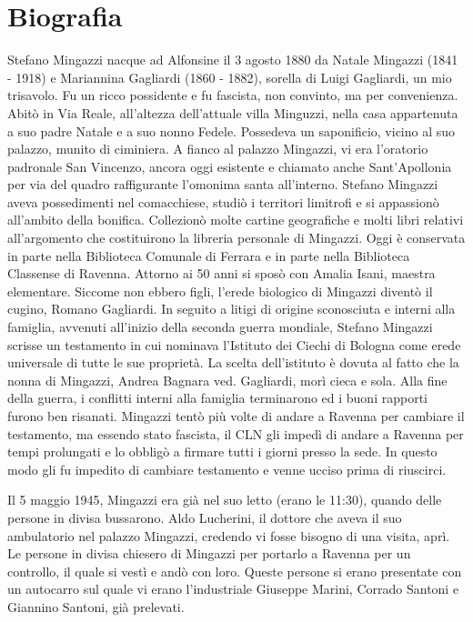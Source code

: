 
\chapter*{Biografia}
Stefano Mingazzi nacque ad Alfonsine il 3 agosto 1880 da Natale Mingazzi (1841 - 1918) e Mariannina Gagliardi (1860 - 1882), sorella di Luigi Gagliardi, un mio trisavolo. Fu un ricco possidente e fu fascista, non convinto, ma per convenienza. Abitò in Via Reale, all'altezza dell'attuale villa Minguzzi, nella casa appartenuta a suo padre Natale e a suo nonno Fedele. Possedeva un saponificio, vicino al suo palazzo, munito di ciminiera. A fianco al palazzo Mingazzi, vi era l'oratorio padronale San Vincenzo, ancora oggi esistente e chiamato anche Sant'Apollonia per via del quadro raffigurante l'omonima santa all'interno.
Stefano Mingazzi aveva possedimenti nel comacchiese, studiò i territori limitrofi e si appassionò all'ambito della bonifica. Collezionò molte cartine geografiche e molti libri relativi all'argomento che costituirono la libreria personale di Mingazzi. Oggi è conservata in parte nella Biblioteca Comunale di Ferrara e in parte nella Biblioteca Classense di Ravenna.
Attorno ai 50 anni si sposò con Amalia Isani, maestra elementare. Siccome non ebbero figli, l'erede biologico di Mingazzi diventò il cugino, Romano Gagliardi. In seguito a litigi di origine sconosciuta e interni alla famiglia, avvenuti all'inizio della seconda guerra mondiale, Stefano Mingazzi scrisse un testamento in cui nominava l'Istituto dei Ciechi di Bologna come erede universale di tutte le sue proprietà. La scelta dell'istituto è dovuta al fatto che la nonna di Mingazzi, Andrea Bagnara ved. Gagliardi, morì cieca e sola. Alla fine della guerra, i conflitti interni alla famiglia terminarono ed i buoni rapporti furono ben risanati. Mingazzi tentò più volte di andare a Ravenna per cambiare il testamento, ma essendo stato fascista, il CLN gli impedì di andare a Ravenna per tempi prolungati e lo obbligò a firmare tutti i giorni presso la sede. In questo modo gli fu impedito di cambiare testamento e venne ucciso prima di riuscirci.

\noindent Il 5 maggio 1945, Mingazzi era già nel suo letto (erano le 11:30), quando delle persone in divisa bussarono. Aldo Lucherini, il dottore che aveva il suo ambulatorio nel palazzo Mingazzi, credendo vi fosse bisogno di una visita, aprì. Le persone in divisa chiesero di Mingazzi per portarlo a Ravenna per un controllo, il quale si vestì e andò con loro. Queste persone si erano presentate con un autocarro sul quale vi erano l'industriale Giuseppe Marini, Corrado Santoni e Giannino Santoni, già prelevati.

